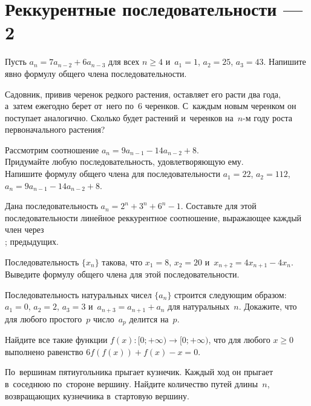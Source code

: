 

\section*{Реккурентные последовательности --- 2}


\begin{problems}

\item
Пусть $a_{n} = 7 a_{n-2} + 6 a_{n-3}$ для всех $n \geq 4$
и~$a_1 = 1$, $a_2 = 25$, $a_3 = 43$.
Напишите явно формулу общего члена последовательности.

\item
Садовник, привив черенок редкого растения, оставляет его расти два года,
а~затем ежегодно берет от~него по~6 черенков.
С~каждым новым черенком он поступает аналогично.
Сколько будет растений и~черенков на~$n$-м году роста первоначального растения?

\item
Рассмотрим соотношение $a_n = 9 a_{n-1} - 14 a_{n-2} + 8$.
\\
\subproblem
Придумайте любую последовательность, удовлетворяющую ему.
\\
\subproblem
Напишите формулу общего члена для последовательности
$a_1 = 22$, $a_2 = 112$, $a_n = 9 a_{n-1} - 14 a_{n-2} + 8$.

\item
Дана последовательность $a_n = 2^n + 3^n + 6^n - 1$.
Составьте для этой последовательности линейное реккурентное соотношение,
выражающее каждый член через
\\
;
\quad
{}
\quad
предыдущих.

\item
Последовательность $\{ x_n \}$ такова, что
$x_1 = 8$, $x_2 = 20$ и~$x_{n+2} = 4 x_{n+1} - 4 x_n$.
Выведите формулу общего члена для этой последовательности.

\item
Последовательность натуральных чисел $\{ a_{n} \}$ строится следующим образом:
$a_1 = 0$, $a_2 = 2$, $a_3 = 3$ и~$a_{n+3} = a_{n+1} + a_n$ для
натуральных~$n$.
Докажите, что для любого простого~$p$ число~$a_p$ делится на~$p$.

\item
Найдите все такие функции $f(x) \colon [0; +\infty) \to [0; +\infty)$, что для
любого $x \geq 0$ выполнено равенство $6 f(f(x)) + f(x) - x = 0$.

\item
По~вершинам пятиугольника прыгает кузнечик.
Каждый ход он прыгает в~соседнюю по~стороне вершину.
Найдите количество путей длины~$n$, возвращающих кузнечиика в~стартовую
вершину.

\end{problems}


